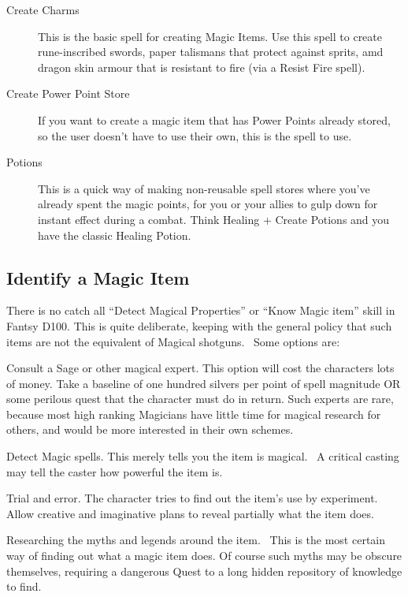 \begin{description}
\item [Create Charms] This is the basic spell for creating Magic Items. Use this spell to create rune-inscribed swords, paper talismans that protect against sprits, amd dragon skin armour that is resistant to fire (via a Resist Fire spell).
\
\item [Create Power Point Store] If you want to create a magic item that has Power Points already stored, so the user doesn’t have to use their own, this is the spell to use.
\item [Potions] This is a quick way of making non-reusable spell stores where you’ve already spent the magic points, for you or your allies to gulp down for instant effect during a combat. Think Healing + Create Potions and you have the classic Healing Potion.
\end{description}

\subsection{Identify a Magic Item}
There is no catch all “Detect Magical Properties” or “Know Magic item” skill in Fantsy D100. This is quite deliberate, keeping with the general policy that such items are not the equivalent of Magical shotguns.  Some options are:

Consult a Sage or other magical expert. This option will cost the characters lots of money. Take a baseline of one hundred silvers per point of spell magnitude OR some perilous quest that the character must do in return. Such experts are rare, because most high ranking Magicians have little time for magical research for others, and would be more interested in their own schemes. 

Detect Magic spells. This merely tells you the item is magical.  A critical casting may tell the caster how powerful the item is.

Trial and error. The character tries to find out the item’s use by experiment. Allow creative and imaginative plans to reveal partially what the item does.

Researching the myths and legends around the item.  This is the most certain way of finding out what a magic item does. Of course such myths may be obscure themselves, requiring a dangerous Quest to a long hidden repository of knowledge to find.

\fi
